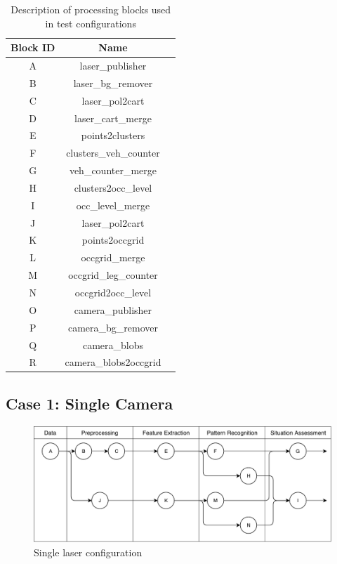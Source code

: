 \begin{table}[ht!]
\footnotesize
\centering
\begin{tabular}{|c | c| c|}
\hline
\textbf{Block ID} & \textbf{Name} \\
\hline
A & laser\_publisher \\
\hline
B & laser\_bg\_remover \\
\hline
C & laser\_pol2cart \\
\hline
D & laser\_cart\_merge \\
\hline
E & points2clusters \\
\hline
F & clusters\_veh\_counter \\
\hline
G & veh\_counter\_merge \\
\hline
H & clusters2occ\_level \\
\hline
I & occ\_level\_merge \\
\hline
J & laser\_pol2cart \\
\hline
K & points2occgrid \\
\hline
L & occgrid\_merge \\
\hline
M & occgrid\_leg\_counter \\
\hline
N & occgrid2occ\_level \\
\hline
O & camera\_publisher \\
\hline
P & camera\_bg\_remover \\
\hline
Q & camera\_blobs \\
\hline
R & camera\_blobs2occgrid \\
\hline
\end{tabular}
\caption{Description of processing blocks used in test configurations}
\label{desc_test_config}
\end{table}


\subsection{Case 1: Single Camera}

\begin{figure}[ht!]
\centering
\includegraphics[scale=0.7]{fig/4/test_configuration1.pdf}
\caption{Single laser configuration}
\label{tconf1}
\end{figure}

